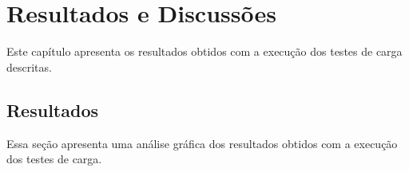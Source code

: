 \chapter{Resultados e Discussões}
\label{cap:resultados}
Este capítulo apresenta os resultados obtidos com a execução dos testes de carga descritas.

\section{Resultados}
Essa seção apresenta uma análise gráfica dos resultados obtidos com a execução dos testes de carga.
